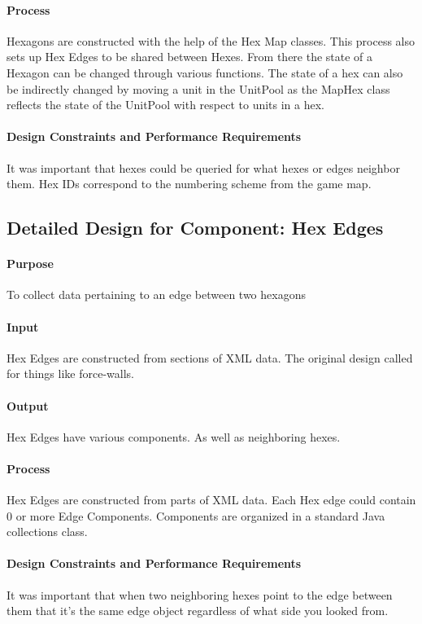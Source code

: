 \documentclass[12pt,a4paper,titlepage]{article}
\begin{document}
\paragraph{Process}
Hexagons are constructed with the help of the Hex Map classes.
This process also sets up Hex Edges to be shared between Hexes.
From there the state of a Hexagon can be changed through various functions.
The state of a hex can also be indirectly changed by moving a unit in the UnitPool
as the MapHex class reflects the state of the UnitPool with respect to units in a hex.
\paragraph{Design Constraints and Performance Requirements}
It was important that hexes could be queried for what hexes or edges neighbor them.
Hex IDs correspond to the numbering scheme from the game map.

\subsection{Detailed Design for Component: Hex Edges}
\paragraph{Purpose} To collect data pertaining to an edge between two hexagons
\paragraph{Input}
Hex Edges are constructed from sections of XML data.
The original design called for things like force-walls.
\paragraph{Output}
Hex Edges have various components. As well as neighboring hexes.
\paragraph{Process}
Hex Edges are constructed from parts of XML data.
Each Hex edge could contain 0 or more Edge Components.
Components are organized in a standard Java collections class.
\paragraph{Design Constraints and Performance Requirements}
It was important that when two neighboring hexes point to the edge between them
that it's the same edge object regardless of what side you looked from.
\end{document}
